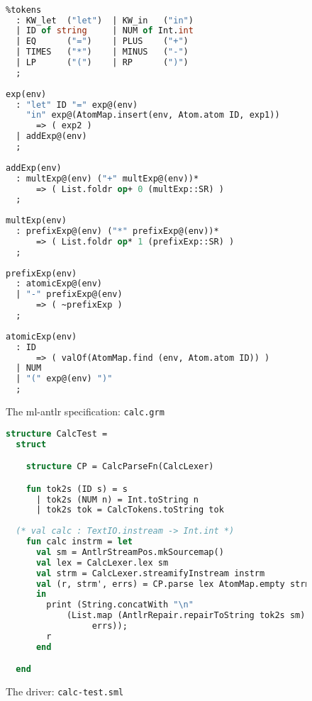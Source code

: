 \begin{figure}[p]
\begin{lstlisting}[language=SML]
%name Calc;

%tokens
  : KW_let  ("let")  | KW_in   ("in")
  | ID of string     | NUM of Int.int
  | EQ      ("=")    | PLUS    ("+")
  | TIMES   ("*")    | MINUS   ("-")
  | LP      ("(")    | RP      (")")
  ;
  
exp(env)
  : "let" ID "=" exp@(env) 
    "in" exp@(AtomMap.insert(env, Atom.atom ID, exp1))
      => ( exp2 )
  | addExp@(env)
  ;
  
addExp(env)
  : multExp@(env) ("+" multExp@(env))*
      => ( List.foldr op+ 0 (multExp::SR) )
  ;
  
multExp(env)
  : prefixExp@(env) ("*" prefixExp@(env))*
      => ( List.foldr op* 1 (prefixExp::SR) )
  ;
  
prefixExp(env)
  : atomicExp@(env)
  | "-" prefixExp@(env)
      => ( ~prefixExp )
  ;
  
atomicExp(env)
  : ID  
      => ( valOf(AtomMap.find (env, Atom.atom ID)) )
  | NUM
  | "(" exp@(env) ")"
  ;
\end{lstlisting}
\caption{The ml-antlr specification: \texttt{calc.grm}}
\label{fig:calc-grm}
\end{figure}%

\begin{figure}
\begin{lstlisting}[language=SML]
structure CalcTest =
  struct

    structure CP = CalcParseFn(CalcLexer)

    fun tok2s (ID s) = s
      | tok2s (NUM n) = Int.toString n
      | tok2s tok = CalcTokens.toString tok
      
  (* val calc : TextIO.instream -> Int.int *)
    fun calc instrm = let
      val sm = AntlrStreamPos.mkSourcemap()
      val lex = CalcLexer.lex sm
      val strm = CalcLexer.streamifyInstream instrm
      val (r, strm', errs) = CP.parse lex AtomMap.empty strm
      in
        print (String.concatWith "\n" 
            (List.map (AntlrRepair.repairToString tok2s sm) 
                 errs));
        r
      end

  end
\end{lstlisting}
\caption{The driver: {\tt calc-test.sml}}
\label{fig:calc-test}
\end{figure}%
